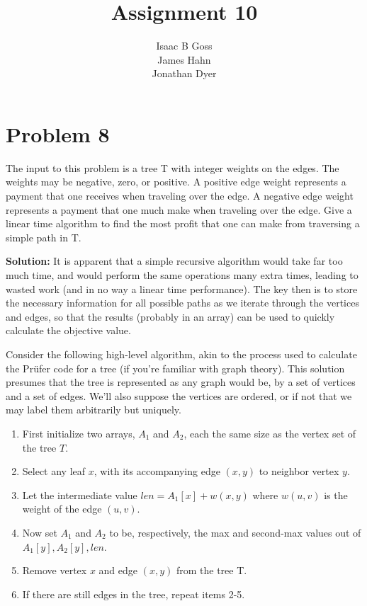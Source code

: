 \documentclass{article}
\author{Isaac B Goss\\ James Hahn\\ Jonathan Dyer}
\title{Assignment 10}
\providecommand{\prob}[1]{\section*{Problem #1}}
\providecommand{\soln}{\textbf{Solution: }}
\providecommand{\tightlist}{
    \setlength{\itemsep}{0pt}\setlength{\parskip}{0pt}
}
\begin{document}
\maketitle

\prob{8}
The input to this problem is a tree T with integer weights on the edges. The weights may be negative, zero, or positive. A positive edge weight represents a payment that one receives when traveling over the edge. A negative edge weight represents a payment that one much make when traveling over the edge. Give a linear time algorithm to find the most profit that one can make from traversing a simple path in T.

\soln
    It is apparent that a simple recursive algorithm would take far too much time, and would perform the same operations many extra times, leading to wasted work (and in no way a linear time performance). The key then is to store the necessary information for all possible paths as we iterate through the vertices and edges, so that the results (probably in an array) can be used to quickly calculate the objective value.
    
    Consider the following high-level algorithm, akin to the process used to calculate the Prüfer code for a tree (if you're familiar with graph theory). This solution presumes that the tree is represented as any graph would be, by a set of vertices and a set of edges. We'll also suppose the vertices are ordered, or if not that we may label them arbitrarily but uniquely.
    \begin{enumerate}\tightlist
        \item First initialize two arrays, $A_1$ and $A_2$, each the same size as the vertex set of the tree $T$.
        \item Select any leaf $x$, with its accompanying edge $(x,y)$ to neighbor vertex $y$.
        \item Let the intermediate value $len = A_1[x] + w(x,y)$ where $w(u,v)$ is the weight of the edge $(u,v)$.
        \item Now set $A_1$ and $A_2$ to be, respectively, the max and second-max values out of ${A_1[y],A_2[y],len}$.
        \item Remove vertex $x$ and edge $(x,y)$ from the tree T.
        \item If there are still edges in the tree, repeat items 2-5.
    \end{enumerate}
    
    
\end{document}
